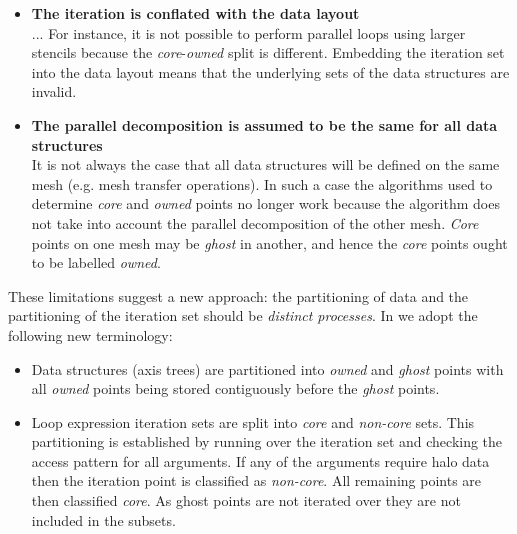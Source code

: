 \documentclass[thesis]{subfiles}
\begin{document}
\begin{itemize}
  \item
    \textbf{The iteration is conflated with the data layout}\\
    ...
    For instance, it is not possible to perform parallel loops using larger stencils because the \textit{core}-\textit{owned} split is different.
    Embedding the iteration set into the data layout means that the underlying sets of the data structures are invalid.

  \item
    \textbf{The parallel decomposition is assumed to be the same for all data structures}\\
    It is not always the case that all data structures will be defined on the same mesh (e.g. mesh transfer operations).
    In such a case the algorithms used to determine \textit{core} and \textit{owned} points no longer work because the algorithm does not take into account the parallel decomposition of the other mesh.
    \textit{Core} points on one mesh may be \textit{ghost} in another, and hence the \textit{core} points ought to be labelled \textit{owned}.
\end{itemize}

These limitations suggest a new approach: the partitioning of data and the partitioning of the iteration set should be \textit{distinct processes}.
In  we adopt the following new terminology:

\begin{itemize}
  \item
    Data structures (axis trees) are partitioned into \textit{owned} and \textit{ghost} points with all \textit{owned} points being stored contiguously before the \textit{ghost} points.

  \item
    Loop expression iteration sets are split into \textit{core} and \textit{non-core} sets.
    This partitioning is established by running over the iteration set and checking the access pattern for all arguments.
    If any of the arguments require halo data then the iteration point is classified as \textit{non-core}.
    All remaining points are then classified \textit{core}.
    As ghost points are not iterated over they are not included in the subsets.
\end{itemize}
\end{document}
